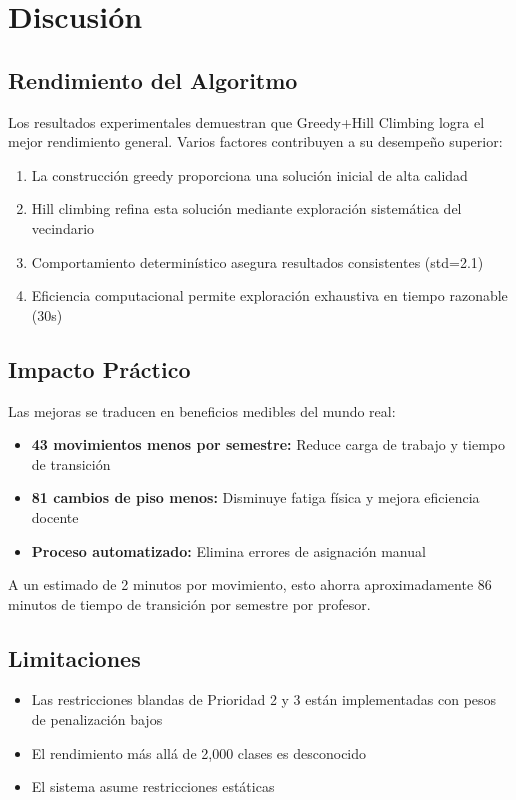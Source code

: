 \documentclass[12pt,a4paper]{article}
\begin{document}
\section{Discusión}

\subsection{Rendimiento del Algoritmo}

Los resultados experimentales demuestran que Greedy+Hill Climbing logra el mejor rendimiento general. Varios factores contribuyen a su desempeño superior:

\begin{enumerate}
\item La construcción greedy proporciona una solución inicial de alta calidad
\item Hill climbing refina esta solución mediante exploración sistemática del vecindario
\item Comportamiento determinístico asegura resultados consistentes (std=2.1)
\item Eficiencia computacional permite exploración exhaustiva en tiempo razonable (30s)
\end{enumerate}

\subsection{Impacto Práctico}

Las mejoras se traducen en beneficios medibles del mundo real:
\begin{itemize}
\item \textbf{43 movimientos menos por semestre:} Reduce carga de trabajo y tiempo de transición
\item \textbf{81 cambios de piso menos:} Disminuye fatiga física y mejora eficiencia docente
\item \textbf{Proceso automatizado:} Elimina errores de asignación manual
\end{itemize}

A un estimado de 2 minutos por movimiento, esto ahorra aproximadamente 86 minutos de tiempo de transición por semestre por profesor.

\subsection{Limitaciones}

\begin{itemize}
\item Las restricciones blandas de Prioridad 2 y 3 están implementadas con pesos de penalización bajos
\item El rendimiento más allá de 2,000 clases es desconocido
\item El sistema asume restricciones estáticas
\end{itemize}
\end{document}
